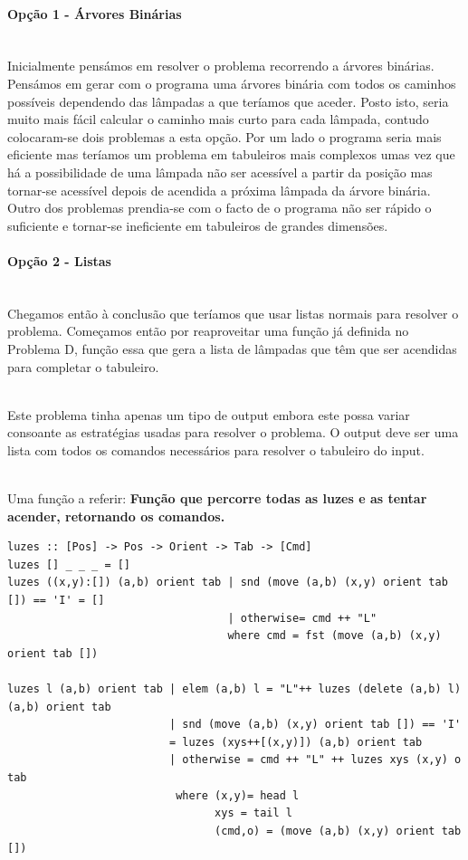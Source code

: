 \documentclass[a4paper,12pt,portuges]{article}
\begin{document}
\paragraph {Opção 1 - Árvores Binárias}
\\
Inicialmente pensámos em resolver o problema recorrendo a árvores binárias. Pensámos em gerar com o programa uma árvores binária com todos os caminhos possíveis dependendo das lâmpadas a que teríamos que aceder. Posto isto, seria muito mais fácil calcular o caminho mais curto para cada lâmpada, contudo colocaram-se dois problemas a esta opção. Por um lado o programa seria mais eficiente mas teríamos um problema em tabuleiros mais complexos umas vez que há a possibilidade de uma lâmpada não ser acessível a partir da posição mas tornar-se acessível depois de acendida a próxima lâmpada da árvore binária. Outro dos problemas prendia-se com o facto de o programa não ser rápido o suficiente e tornar-se ineficiente em tabuleiros de grandes dimensões.

\paragraph {Opção 2 - Listas}
\\
Chegamos então à conclusão que teríamos que usar listas normais para resolver o problema. Começamos então por reaproveitar uma função já definida no Problema D, função essa que gera a lista de lâmpadas que têm que ser acendidas para completar o tabuleiro.

\\

Este problema tinha apenas um tipo de output embora este possa variar consoante as estratégias usadas para resolver o problema. O output deve ser uma lista com todos os comandos necessários para resolver o tabuleiro do input.

\\

Uma função a referir:
\textbf{Função que percorre todas as luzes e as tentar acender, retornando os comandos.} \\
\begin{verbatim}
luzes :: [Pos] -> Pos -> Orient -> Tab -> [Cmd]
luzes [] _ _ _ = []
luzes ((x,y):[]) (a,b) orient tab | snd (move (a,b) (x,y) orient tab []) == 'I' = []
                                  | otherwise= cmd ++ "L" 
                                  where cmd = fst (move (a,b) (x,y) orient tab []) 
                       
luzes l (a,b) orient tab | elem (a,b) l = "L"++ luzes (delete (a,b) l) (a,b) orient tab
                         | snd (move (a,b) (x,y) orient tab []) == 'I' 
                         = luzes (xys++[(x,y)]) (a,b) orient tab
                         | otherwise = cmd ++ "L" ++ luzes xys (x,y) o tab
                          where (x,y)= head l
                                xys = tail l
                                (cmd,o) = (move (a,b) (x,y) orient tab [])
\end{verbatim}
\end{document}
